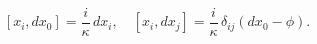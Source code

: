 \begin{equation}\label{34}
[x_i, dx_0] = \frac i\kappa\, dx_i, \quad [x_i, dx_j] = \frac i\kappa\,
\delta_{ij} \left( dx_0 - \phi\right).
\end{equation}

